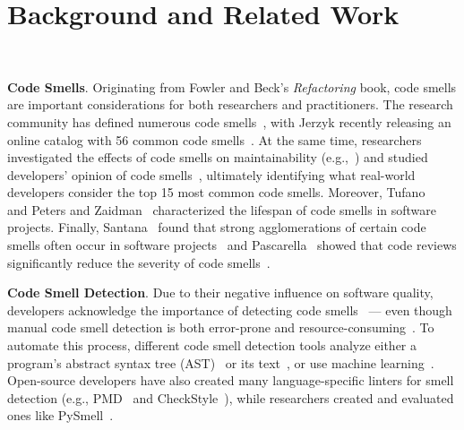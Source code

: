\vspace*{-0.5em}

\section{Background and Related Work}~\label{sec:background}

\vspace*{-1em}


{\bf Code Smells}.
Originating from Fowler and Beck's \textit{Refactoring} book, code smells are
important considerations for both researchers and practitioners.
The research community has defined numerous code
smells~\cite{Pysmell,SQLAntipatterns,CleanCode,RefactoringWorkbook}, with
Jerzyk recently releasing an online catalog with 56 common code
smells~\cite{Jerzyk2023}.
At the same time, researchers investigated the effects of code smells on
maintainability (e.g.,~\cite{6392174, 6405287}) and studied developers' opinion
of code smells~\cite{developersCare}, ultimately identifying what real-world
developers consider the top 15 most common code smells.
Moreover, Tufano~\etal{}~\cite{whenandwhy} and Peters and
Zaidman~\cite{lifespan} characterized the lifespan of code smells in software
projects.
Finally, Santana~\etal{} found that strong agglomerations of certain code
smells often occur in software projects~\cite{Santana} and Pascarella~\etal{}
showed that code reviews significantly reduce the severity of code
smells~\cite{Pascarella}.


{\bf Code Smell Detection}. Due to their negative influence on software
quality, developers acknowledge the importance of detecting code
smells~\cite{developersCare} --- even though manual code smell detection is
both error-prone and resource-consuming~\cite{DetectingDefectsInObject}.
%
To automate this process, different code smell detection tools analyze either a
program's abstract syntax tree (AST)~\cite{Lenarduzzi2023} or its
text~\cite{Palomba}, or use machine learning~\cite{ML}.
%
Open-source developers have also created many language-specific linters for
smell detection (e.g., PMD~\cite{PMD} and CheckStyle~\cite{CheckStyle}), while
researchers created and evaluated ones like PySmell~\cite{Pysmell}.

